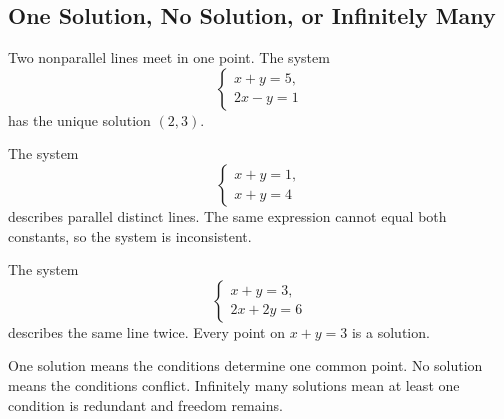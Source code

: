 \subsection{One Solution, No Solution, or Infinitely Many}

\begin{examplebox}
Two nonparallel lines meet in one point. The system
\[
\begin{cases}x+y=5,\\2x-y=1\end{cases}
\]
has the unique solution $(2,3)$.
\end{examplebox}

\begin{examplebox}[No solution]
The system
\[
\begin{cases}x+y=1,\\x+y=4\end{cases}
\]
describes parallel distinct lines. The same expression cannot equal both constants, so the system is inconsistent.
\end{examplebox}

\begin{examplebox}
The system
\[
\begin{cases}x+y=3,\\2x+2y=6\end{cases}
\]
describes the same line twice. Every point on $x+y=3$ is a solution.
\end{examplebox}

\begin{interpretationbox}
One solution means the conditions determine one common point. No solution means the conditions conflict. Infinitely many solutions mean at least one condition is redundant and freedom remains.
\end{interpretationbox}
